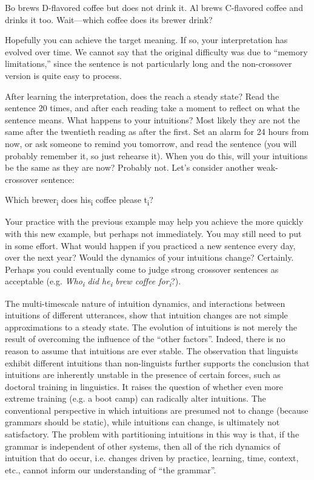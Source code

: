 \ea
\begin{exe}
  {Bo brews D-flavored coffee but does not drink it. Al brews C-flavored coffee and drinks it too.} 
  {Wait—which coffee does its brewer drink?}
\end{exe}
\z

  Hopefully you can achieve the target  meaning. If so, your interpretation has evolved over time. We cannot say that the original difficulty was due to “memory limitations,” since the sentence is not particularly long and the non-crossover version is quite easy to process. 

  After learning the  interpretation, does the  reach a steady state? Read the sentence 20 times, and after each reading take a moment to reflect on what the sentence means. What happens to your intuitions? Most likely they are not the same after the twentieth reading as after the first. Set an alarm for 24 hours from now, or ask someone to remind you tomorrow, and read the sentence (you will probably remember it, so just rehearse it). When you do this, will your intuitions be the same as they are now? Probably not. Let's consider another weak-crossover sentence: 

\ea
Which brewer\textsubscript{i} does his\textsubscript{i} coffee please t\textsubscript{i}?
\z

  Your practice with the previous example may help you achieve the  more quickly with this new example, but perhaps not immediately. You may still need to put in some effort. What would happen if you practiced a new  sentence every day, over the next year? Would the dynamics of your intuitions change? Certainly. Perhaps you could eventually come to judge strong crossover sentences as acceptable (e.g. \textit{Who\textsubscript{i} did he\textsubscript{i} brew coffee for\textsubscript{i}}?). 

  The multi-timescale nature of intuition dynamics, and interactions between intuitions of different utterances, show that intuition changes are not simple approximations to a steady state. The evolution of intuitions is not merely the result of overcoming the influence of the “other factors”. Indeed, there is no reason to assume that intuitions are ever stable. The observation that linguists exhibit different intuitions than non-linguists \citep{Spencer1973} further supports the conclusion that intuitions are inherently unstable in the presence of certain  forces, such as doctoral training in linguistics. It raises the question of whether even more extreme training (e.g. a  boot camp) can radically alter intuitions. The conventional perspective in which  intuitions are presumed not to change (because grammars should be static), while  intuitions can change, is ultimately not satisfactory. The problem with partitioning intuitions in this way is that, if the grammar is independent of other systems, then all of the rich dynamics of intuition that do occur, i.e. changes driven by practice, learning, time, context, etc., cannot inform our understanding of “the grammar”.

